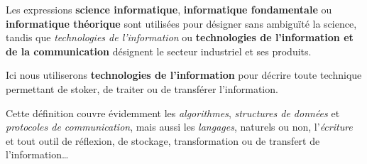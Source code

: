 \begin{coolquote}
Les expressions \textbf{science informatique}, \textbf{informatique fondamentale} ou \textbf{informatique théorique} sont utilisées pour désigner sans ambiguïté la science, tandis que \emph{technologies de l'information} ou \textbf{technologies de l'information et de la communication} désignent le secteur industriel et ses produits.
\end{coolquote}

Ici nous utiliserons \textbf{technologies de l'information} pour décrire toute technique permettant de stoker, de traiter ou de transférer l'information. 

Cette définition couvre évidemment les \emph{algorithmes}, \emph{structures de données} et \emph{protocoles de communication}, mais aussi les \emph{langages}, naturels ou non, l'\emph{écriture} et tout outil de réflexion, de stockage, transformation ou de transfert de l'information\ldots
